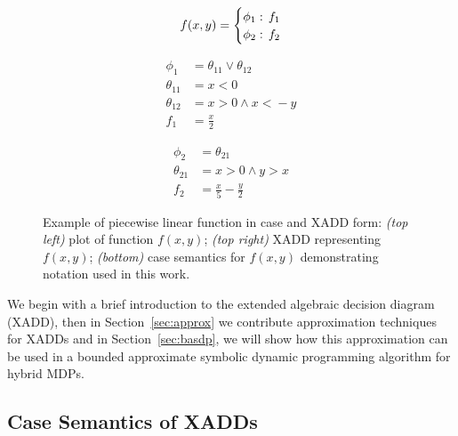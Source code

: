 \begin{figure}[t!]
\begin{minipage}{0.16\textwidth}
{\scriptsize
\begin{align*}
f(x,y)= 
\begin{cases}
  \phi_1:& \hspace{-2mm} f_1\\ 
  \phi_2: & \hspace{-2mm}f_2\\ 
\end{cases}
\end{align*} }
\end{minipage}
\begin{minipage}{0.16\textwidth}
{\scriptsize
\begin{align*}
 \phi_1 & = \theta_{11}\vee \theta_{12}\\
\theta_{11} & = x\!<\!0 \\
\theta_{12} & = x\!>\!0 \wedge x\!<\!-y \\
 f_1 & = \displaystyle \frac{x}{2} 
\end{align*} }
\end{minipage}
\begin{minipage}{0.15\textwidth}
{\scriptsize
\begin{align*}
\phi_2 & = \theta_{21}\\
\theta_{21} & = x\!>\!0 \wedge y\!>\!x\\
f_2 & = \displaystyle \frac{x}{5} - \frac{y}{2}
\end{align*} }
\end{minipage}
\vspace{-6mm}

\caption{\footnotesize Example of piecewise linear function in case and XADD form: \emph{(top left)} plot of function $f(x,y)$; \emph{(top right)} XADD representing $f(x,y)$; \emph{(bottom)} case semantics for $f(x,y)$ demonstrating notation used in this work.}
\label{fig:symbex}
\end{figure}

\label{sec:xadd}

We begin with a brief introduction to the extended algebraic decision
diagram (XADD), then in Section~\ref{sec:approx} we contribute
approximation techniques for XADDs and in Section~\ref{sec:basdp}, we
will show how this approximation can be used in a bounded
approximate symbolic dynamic programming algorithm for hybrid MDPs.

\subsection{Case Semantics of XADDs}

